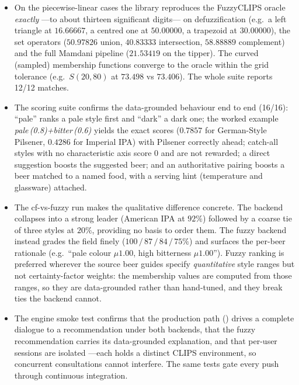 \begin{itemize}
  \item On the piecewise-linear cases the library reproduces the FuzzyCLIPS
  oracle \emph{exactly} ---to about thirteen significant digits--- on
  defuzzification (e.g.\ a left triangle at $16.66667$, a centred one at
  $50.00000$, a trapezoid at $30.00000$), the set operators ($50.97826$ union,
  $40.83333$ intersection, $58.88889$ complement) and the full Mamdani pipeline
  ($21.53419$ on the tipper). The curved (sampled) membership functions converge
  to the oracle within the grid tolerance (e.g.\ $S(20,80)$ at $73.498$ vs
  $73.406$). The whole suite reports 12/12 matches.
  \item The scoring suite confirms the data-grounded behaviour end to end
  (16/16): ``pale'' ranks a pale style first and ``dark'' a dark one; the worked
  example \emph{pale\,(0.8)+bitter\,(0.6)} yields the exact scores
  ($0.7857$ for German-Style Pilsener, $0.4286$ for Imperial IPA) with Pilsener
  correctly ahead; catch-all styles with no characteristic axis score $0$ and
  are not rewarded; a direct suggestion boosts the suggested beer; and an
  authoritative pairing boosts a beer matched to a named food, with a serving
  hint (temperature and glassware) attached.
  \item The cf-vs-fuzzy run makes the qualitative difference concrete. The \cf{}
  backend collapses into a strong leader (American IPA at $92\%$) followed by a
  coarse tie of three styles at $20\%$, providing no basis to order them.
  The fuzzy backend instead grades the field finely
  ($100\,/\,87\,/\,84\,/\,75\%$) and surfaces the per-beer rationale (e.g.\
  ``pale colour $\mu1.00$, high bitterness $\mu1.00$''). Fuzzy ranking is
  preferred wherever the source beer guides specify \emph{quantitative} style
  ranges but not certainty-factor weights: the membership values are computed
  from those ranges, so they are data-grounded rather than hand-tuned, and they
  break ties the \cf{} backend cannot.
  \item The engine smoke test confirms that the production path
  () drives a complete dialogue to a recommendation under both
  backends, that the fuzzy recommendation carries its data-grounded explanation,
  and that per-user sessions are isolated ---each holds a distinct CLIPS
  environment, so concurrent consultations cannot interfere. The same tests gate
  every push through continuous integration.
\end{itemize}
